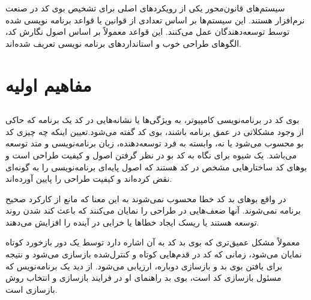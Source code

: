 سیستم‌های قانون‌محور یکی از رویکردهای اصلی برای تشخیص بوی کد در صنعت نرم‌افزار هستند. این سیستم‌ها بر اساس تعدادی از قوانین یا قواعد برنامه نویسی شده توسط توسعه‌دهندگان عمل می‌کنند. این قواعد معمولاً بر اساس اصول نگارش کد، الگوهای طراحی خوب و استانداردهای برنامه نویسی تعریف شده‌اند.
\section[مفاهیم اولیه]{مفاهیم اولیه}
\subsection {}
بوی کد در برنامه‌نویسی کامپیوتر، به ویژگی‌ها یا نشانه‌هایی در کد یک برنامه که حاکی از وجود مشکلاتی در عمق برنامه باشند، بوی کد گفته می‌شود.تعیین اینکه چه چیزی کد بو محسوب می‌شود یا نه، وابسته به فرد توسعه‌دهنده، زبان برنامه‌نویسی و متد توسعه می‌باشد.
یک شیوه برای نگاه به کد بو در نظر گرفتن اصول و کیفیت طراحی است و بوهای کد ساختارهایی مشخص در کد هستند که اصول پایه‌ای برنامه‌نویسی را به گونه‌ای نقض کرده‌اند و کیفیت طراحی را پایین آورده‌اند.

در واقع بوهای بد کد خطا محسوب نمی‌شوند به این معنا که مانع از کارکرد صحیح برنامه نمی‌شوند. آنها ضعف‌هایی در طراحی را نمایان می‌کنند که باعث کند شدن روند توسعه هستند یا ریسک ایجاد خطاها یا خرابی در آینده را افزایش می‌دهند.

معمولاً مشکل عمیق‌تری که بوی بد کد به آن اشاره دارد توسط یک دور بازخورد کوتاه نمایان می‌شود، زمانی که کد در قدم‌هایی کوتاه و کنترل‌شده بازسازی می‌شود و نتیجه برای یافتن بوی بد و بازسازی دوباره، ارزیابی می‌شود. از دید یک برنامه‌نویس که مسئول بازسازی کد است، بوی بد راهنمای او در فرایند بازسازی و انتخاب روش بازسازی است.\cite{whatiscodesmell}

